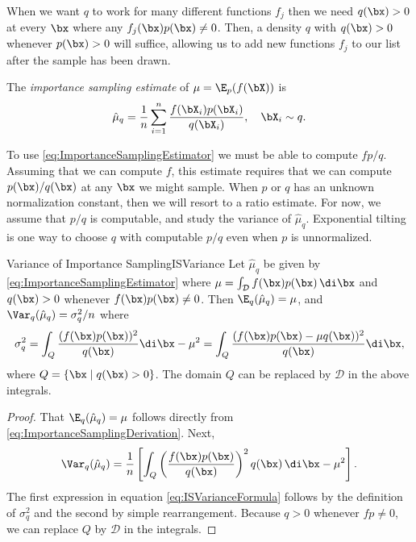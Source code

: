 When we want $q$ to work for many different functions $f_j$ then we need $q(\bx) > 0$ at every $\bx$ where any $f_j(\bx)p(\bx) \neq 0$. Then, a density $q$ with $q(\bx) > 0$ whenever $p(\bx) > 0$ will suffice, allowing us to add new functions $f_j$ to our list after the sample has been drawn.

The \textit{importance sampling estimate} of $\mu = \E_p(f(\bX))$ is
\begin{equation}
	\hat{\mu}_q = \frac{1}{n} \sum_{i=1}^n \frac{f(\bX_i)p(\bX_i)}{q(\bX_i)}, \quad \bX_i \sim q.
	\label{eq:ImportanceSamplingEstimator}
\end{equation}

To use \eqref{eq:ImportanceSamplingEstimator} we must be able to compute $fp/q$. Assuming that we can compute $f$, this estimate requires that we can compute $p(\bx)/q(\bx)$ at any $\bx$ we might sample. When $p$ or $q$ has an unknown normalization constant, then we will resort to a ratio estimate. For now, we assume that $p/q$ is computable, and study the variance of $\hat{\mu}_q$. Exponential tilting is one way to choose $q$ with computable $p/q$ even when $p$ is unnormalized.

\begin{thm}{Variance of Importance Sampling}{ISVariance}
	Let $\hat{\mu}_q$ be given by \eqref{eq:ImportanceSamplingEstimator} where $\mu = \int_{\mathcal{D}} f(\bx)p(\bx) \, \di \bx$ and $q(\bx) > 0$ whenever $f(\bx)p(\bx) \neq 0$. Then $\E_q(\hat{\mu}_q) = \mu$, and $\Var_q(\hat{\mu}_q) = \sigma_q^2/n$ where
	\begin{equation}
		\sigma_q^2 = \int_Q \frac{(f(\bx)p(\bx))^2}{q(\bx)} \di \bx - \mu^2 = \int_Q \frac{(f(\bx)p(\bx) - \mu q(\bx))^2}{q(\bx)} \di \bx,
		\label{eq:ISVarianceFormula}
	\end{equation}
	where $Q = \{ \bx \mid q(\bx) > 0 \}$. The domain $Q$ can be replaced by $\mathcal{D}$ in the above integrals.
\end{thm}

\begin{proof}
	That $\E_q(\hat{\mu}_q) = \mu$ follows directly from \eqref{eq:ImportanceSamplingDerivation}. Next,
	\[
		\Var_q(\hat{\mu}_q) = \frac{1}{n} \left[ \int_Q \left( \frac{f(\bx)p(\bx)}{q(\bx)} \right)^2 q(\bx) \, \di \bx - \mu^2 \right].
	\]
	The first expression in equation \eqref{eq:ISVarianceFormula} follows by the definition of $\sigma_q^2$ and the second by simple rearrangement. Because $q > 0$ whenever $fp \neq 0$, we can replace $Q$ by $\mathcal{D}$ in the integrals.
\end{proof}

